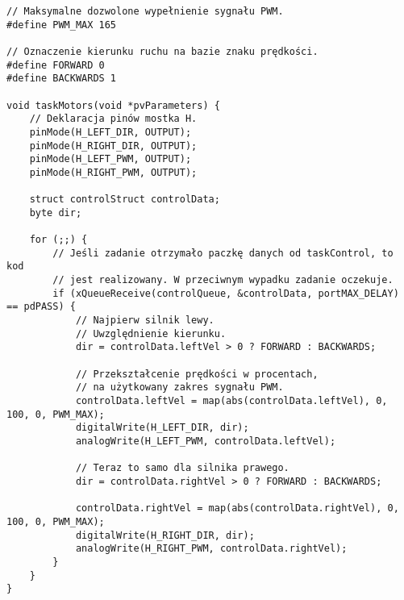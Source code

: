 \documentclass[11pt]{article}
\begin{document}
\begin{appendices}
\begin{lstlisting}[basicstyle = \ttfamily \footnotesize]
// Maksymalne dozwolone wypełnienie sygnału PWM.
#define PWM_MAX 165

// Oznaczenie kierunku ruchu na bazie znaku prędkości.
#define FORWARD 0
#define BACKWARDS 1

void taskMotors(void *pvParameters) {
    // Deklaracja pinów mostka H.
    pinMode(H_LEFT_DIR, OUTPUT);
    pinMode(H_RIGHT_DIR, OUTPUT);
    pinMode(H_LEFT_PWM, OUTPUT);
    pinMode(H_RIGHT_PWM, OUTPUT);

    struct controlStruct controlData;
    byte dir;

    for (;;) {
        // Jeśli zadanie otrzymało paczkę danych od taskControl, to kod
        // jest realizowany. W przeciwnym wypadku zadanie oczekuje.
        if (xQueueReceive(controlQueue, &controlData, portMAX_DELAY) == pdPASS) {
            // Najpierw silnik lewy.
            // Uwzględnienie kierunku.
            dir = controlData.leftVel > 0 ? FORWARD : BACKWARDS;

            // Przekształcenie prędkości w procentach,
            // na użytkowany zakres sygnału PWM.            
            controlData.leftVel = map(abs(controlData.leftVel), 0, 100, 0, PWM_MAX);
            digitalWrite(H_LEFT_DIR, dir);
            analogWrite(H_LEFT_PWM, controlData.leftVel);

            // Teraz to samo dla silnika prawego.
            dir = controlData.rightVel > 0 ? FORWARD : BACKWARDS;
            
            controlData.rightVel = map(abs(controlData.rightVel), 0, 100, 0, PWM_MAX);
            digitalWrite(H_RIGHT_DIR, dir);
            analogWrite(H_RIGHT_PWM, controlData.rightVel);
        }
    }    
}
\end{lstlisting}
\end{appendices}
\end{document}
